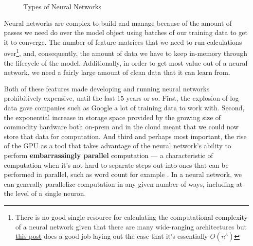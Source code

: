 \documentclass[11pt, table]{diazessay} %
\begin{document}
\begin{sloppypar}
\begin{figure}[H]
\centering
{}
\caption{Types of Neural Networks}
\end{figure}


Neural networks are complex to build and manage because of the amount of passes we need do over the model object using batches of our training data to get it to converge. The number of feature matrices that we need to run calculations over\footnote{There is no good single resource for calculating the computational complexity of a neural network given that there are many wide-ranging architectures but   \href{https://lunalux.io/computational-complexity-of-neural-networks/}{this post} does a good job laying out the case that it's essentially $O(n^5)$}, and, consequently, the amount of data we have to keep in-memory through the lifecycle of the model. Additionally, in order to get most value out of a neural network, we need a fairly large amount of clean data that it can learn from. 

Both of these features made developing and running neural networks prohibitively expensive, until the last 15 years or so. First,  the explosion of log data gave companies such as Google a lot of training data to work with. Second,  the exponential increase in storage space provided by the growing size of commodity hardware both on-prem and in the cloud meant that we could now store that data for computation.  And third and perhaps most important, the rise of the GPU as a tool that takes advantage of the neural network's ability to perform \textbf{embarrassingly parallel} computation --- a characteristic of computation when it's not hard to separate steps out into ones that can be performed in parallel, such as word count for example . In a neural network, we can generally parallelize computation in any given number of ways, including at the level of a single neuron.  


\end{sloppypar}
\end{document}
